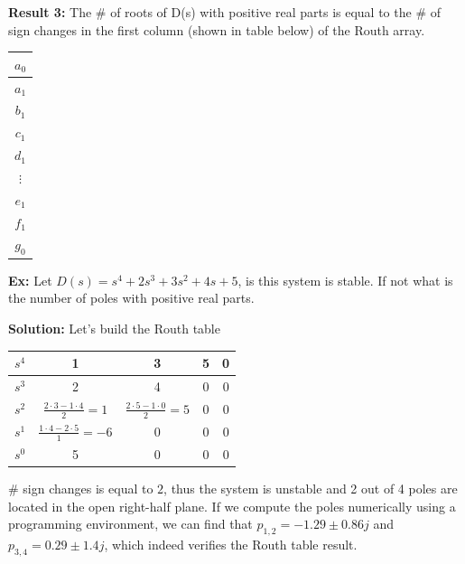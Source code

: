 \documentclass[twoside]{article}
\begin{document}
\textbf{Result 3:} The $\#$ of roots of D(s) with positive real parts 
is equal to the $\#$ of sign changes in the first column (shown in
table below) of the Routh array. 
%
\begin{table}[h]
\begin{center}
\begin{tabular}{|| c || }
\hline
$a_0$ 
\\ \hline
$a_1$ 
\\ \hline
$b_1$ 
\\ \hline
$c_1$ 
\\ \hline
$d_1$ 
\\ \hline
$\vdots$ 
\\ \hline
$e_1$ 
\\ \hline
$f_1$ 
\\ \hline
$g_0$ 
\\ \hline
\end{tabular}
\end{center}
\end{table}

\textbf{Ex:} Let $D(s) = s^4 + 2 s^3 + 3 s^2 + 4 s + 5$, is this
system is stable. If not what is the number of poles with positive 
real parts. 

\textbf{Solution:} Let's build the Routh table

\begin{minipage}[h]{1\linewidth}
\begin{center}
\begin{tabular}{|c || c || c c c |}
\hline
$s^4$ & 1 & 3 & 5 & 0 
\\ \hline
$s^3$ & 2 & 4 & 0 & 0 
\\ \hline
$s^2$ & $\frac{2 \cdot 3 - 1 \cdot 4}{2} = 1$ & $\frac{2 \cdot 5 - 1 \cdot 0}{2} = 5$  & 0 & 0
\\ \hline
$s^1$ &  $\frac{1 \cdot 4 - 2 \cdot 5}{1} = -6$ & 0 & 0 & 0 
\\ \hline
$s^0$ & 5 & 0 & 0 & 0 
\\ \hline
\end{tabular}
\end{center}
\end{minipage}

\vspace{6pt}

$\#$ sign changes is equal to $2$, thus the system is unstable and 2
out of 4 poles are located in the open right-half plane. If we
compute the poles numerically using a programming environment, 
we can find that $p_{1,2} =   -1.29 \pm 0.86 j$ and  $p_{3,4} = 0.29
\pm 1.4 j$, which indeed verifies the Routh table result. 
 
\end{document}
